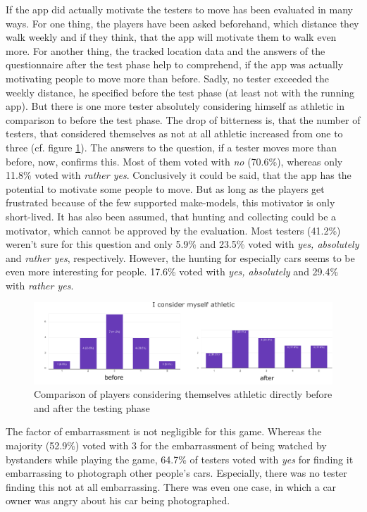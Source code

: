 If the app did actually motivate the testers to move has been evaluated in many ways. For one thing, the players have been asked beforehand, which distance they walk weekly and if they think, that the app will motivate them to walk even more. For another thing, the tracked location data and the answers of the questionnaire after the test phase help to comprehend, if the app was actually motivating people to move more than before. Sadly, no tester exceeded the weekly distance, he specified before the test phase (at least not with the running app). But there is one more tester absolutely considering himself as athletic in comparison to before the test phase. The drop of bitterness is, that the number of testers, that considered themselves as not at all athletic increased from one to three (cf. figure \ref{fig:athletic}). The answers to the question, if a tester moves more than before, now, confirms this. Most of them voted with \emph{no} (70.6\%), whereas only 11.8\% voted with \emph{rather yes}. Conclusively it could be said, that the app has the potential to motivate some people to move. But as long as the players get frustrated because of the few supported make-models, this motivator is only short-lived. It has also been assumed, that hunting and collecting could be a motivator, which cannot be approved by the evaluation. Most testers (41.2\%) weren't sure for this question and only 5.9\% and 23.5\% voted with \emph{yes, absolutely} and \emph{rather yes}, respectively. However, the hunting for especially cars seems to be even more interesting for people. 17.6\% voted with \emph{yes, absolutely} and 29.4\% with \emph{rather yes}.
\begin{figure}[btph]
  \centering
        \includegraphics[width=.95\linewidth]{gfx/consider_athletic}
        \caption{Comparison of players considering themselves athletic directly before and after the testing phase}
        \label{fig:athletic}
\end{figure}

The factor of embarrassment is not negligible for this game. Whereas the majority (52.9\%) voted with $3$ for the embarrassment of being watched by bystanders while playing the game, 64.7\% of testers voted with \emph{yes} for finding it embarrassing to photograph other people's cars. Especially, there was no tester finding this not at all embarrassing. There was even one case, in which a car owner was angry about his car being photographed.

